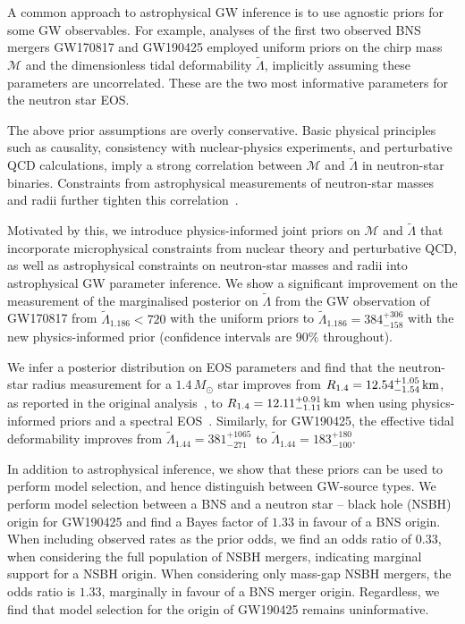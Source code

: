 \documentclass[twocolumn]{aastex631}
\begin{document}
A common approach to astrophysical GW inference is to use agnostic priors
for some GW observables. For example, analyses of the first two observed
BNS mergers GW170817 \citep[e.g.,][]{abbott17_170817observation,
  abbott18_170817EOS, abbott19_170817Properties} and GW190425
\citep[e.g.,][]{abbott20_190425} employed uniform priors on the chirp
mass $\mathcal{M}$ and the dimensionless tidal deformability
$\tilde{\Lambda}$, implicitly assuming these parameters are
uncorrelated. These are the two most informative parameters for the
neutron star EOS.

The above prior assumptions are overly conservative. Basic physical
principles such as causality, consistency with nuclear-physics
experiments, and perturbative QCD calculations, imply a strong
correlation between $\mathcal{M}$ and $\tilde{\Lambda}$ in neutron-star
binaries. Constraints from astrophysical measurements of neutron-star
masses and radii further tighten this correlation~\citep{Altiparmak:2022,
  Ecker:2022, Ecker:2022dlg}.

Motivated by this, we introduce physics-informed joint priors on
$\mathcal{M}$ and $\tilde{\Lambda}$ that incorporate microphysical
constraints from nuclear theory and perturbative QCD, as well as
astrophysical constraints on neutron-star masses and radii into
astrophysical GW parameter inference. We show a significant improvement
on the measurement of the marginalised posterior on $\tilde{\Lambda}$
from the GW observation of GW170817 from $\tilde{\Lambda}_{1.186} < 720$
with the uniform priors to $\tilde{\Lambda}_{1.186} = 384^{+306}_{-158}$
with the new physics-informed prior (confidence intervals are $90\%$
throughout).

We infer a posterior distribution on EOS parameters and find that the
neutron-star radius measurement for a $1.4\,{M_\odot}$ star improves from
${R_{1.4}}=12.54^{+1.05}_{-1.54}\,{\rm km}$, as reported in the original analysis~\citep{abbott19_170817Properties}, to
${R_{1.4}}=12.11^{+0.91}_{-1.11}\,{\rm km}$ when using physics-informed
priors and a spectral EOS~\citep[see also][for some of the first
  estimates made after the GW170817
  event]{Most2018,Capano2020}. Similarly, for GW190425, the effective
tidal deformability improves from $\tilde{\Lambda}_{1.44} =
381^{+1065}_{-271}$ to $\tilde{\Lambda}_{1.44} = 183^{+180}_{-100}$.

In addition to astrophysical inference, we show that these priors can be
used to perform model selection, and hence distinguish between GW-source
types. We perform model selection between a BNS and a neutron star --
black hole (NSBH) origin for GW190425 and find a Bayes factor of $1.33$
in favour of a BNS origin. When including observed rates as the prior odds,
we find an odds ratio of $0.33$, when considering the full population of
NSBH mergers, indicating marginal support for a NSBH origin.  When
considering only mass-gap NSBH mergers, the odds ratio is $1.33$,
marginally in favour of a BNS merger origin. Regardless, we find that
model selection for the origin of GW190425 remains uninformative.
	
\end{document}
